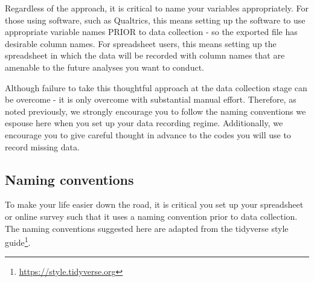 \documentclass[
]{krantz}
\renewcommand{\href}[2]{#2\footnote{\url{#1}}}
\begin{document}
Regardless of the approach, it is critical to name your variables appropriately. For those using software, such as Qualtrics, this means setting up the software to use appropriate variable names PRIOR to data collection - so the exported file has desirable column names. For spreadsheet users, this means setting up the spreadsheet in which the data will be recorded with column names that are amenable to the future analyses you want to conduct.

Although failure to take this thoughtful approach at the data collection stage can be overcome - it is only overcome with substantial manual effort. Therefore, as noted previously, we strongly encourage you to follow the naming conventions we espouse here when you set up your data recording regime. Additionally, we encourage you to give careful thought in advance to the codes you will use to record missing data.

\hypertarget{naming-conventions}{%
\subsection{Naming conventions}\label{naming-conventions}}

To make your life easier down the road, it is critical you set up your spreadsheet or online survey such that it uses a naming convention prior to data collection. The naming conventions suggested here are adapted from the tidyverse \href{https://style.tidyverse.org}{style guide}.
\end{document}
